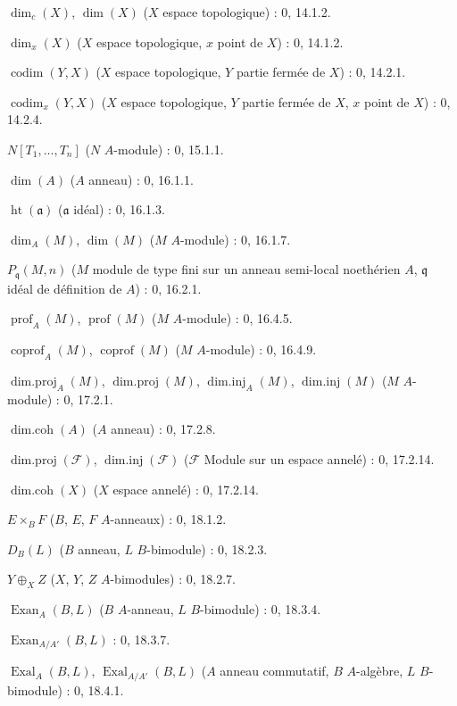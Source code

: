 $\dim_c(X)$, $\dim(X)$ ($X$ espace topologique) : 0, 14.1.2.\par
$\dim_x(X)$ ($X$ espace topologique, $x$ point de $X$) : 0, 14.1.2.\par
$\operatorname{codim}(Y,X)$ ($X$ espace topologique, $Y$ partie fermée de $X$) : 0, 14.2.1.\par
$\operatorname{codim}_x(Y,X)$ ($X$ espace topologique, $Y$ partie fermée de $X$, $x$ point de $X$) : 0, 14.2.4.\par
$N[T_1,\ldots,T_n]$ ($N$ $A$-module) : 0, 15.1.1.\par
$\dim(A)$ ($A$ anneau) : 0, 16.1.1.\par
$\operatorname{ht}(\mathfrak a)$ ($\mathfrak a$ idéal) : 0, 16.1.3.\par
$\dim_A(M)$, $\dim(M)$ ($M$ $A$-module) : 0, 16.1.7.\par
$P_{\mathfrak q}(M,n)$ ($M$ module de type fini sur un anneau semi-local noethérien $A$, $\mathfrak q$ idéal de définition de $A$) : 0, 16.2.1.\par
$\operatorname{prof}_A(M)$, $\operatorname{prof}(M)$ ($M$ $A$-module) : 0, 16.4.5.\par
$\operatorname{coprof}_A(M)$, $\operatorname{coprof}(M)$ ($M$ $A$-module) : 0, 16.4.9.\par
$\operatorname{dim.proj}_A(M)$, $\operatorname{dim.proj}(M)$,
$\operatorname{dim.inj}_A(M)$, $\operatorname{dim.inj}(M)$ ($M$ $A$-module) : 0, 17.2.1.\par
$\operatorname{dim.coh}(A)$ ($A$ anneau) : 0, 17.2.8.\par
$\operatorname{dim.proj}(\mathscr F)$, $\operatorname{dim.inj}(\mathscr F)$
($\mathscr F$ Module sur un espace annelé) : 0, 17.2.14.\par
$\operatorname{dim.coh}(X)$ ($X$ espace annelé) : 0, 17.2.14.\par
$E\times_B F$ ($B$, $E$, $F$ $A$-anneaux) : 0, 18.1.2.\par
$D_B(L)$ ($B$ anneau, $L$ $B$-bimodule) : 0, 18.2.3.\par
$Y\oplus_X Z$ ($X$, $Y$, $Z$ $A$-bimodules) : 0, 18.2.7.\par
$\operatorname{Exan}_A(B,L)$ ($B$ $A$-anneau, $L$ $B$-bimodule) : 0, 18.3.4.\par
$\operatorname{Exan}_{A/A'}(B,L)$ : 0, 18.3.7.\par
$\operatorname{Exal}_A(B,L)$, $\operatorname{Exal}_{A/A'}(B,L)$ ($A$ anneau commutatif, $B$ $A$-algèbre, $L$ $B$-bimodule) : 0, 18.4.1.\par
